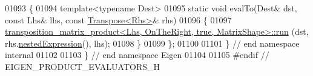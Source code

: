 \begin{DoxyCode}
01093 \{
01094   \textcolor{keyword}{template}<\textcolor{keyword}{typename} Dest>
01095   \textcolor{keyword}{static} \textcolor{keywordtype}{void} evalTo(Dest& dst, \textcolor{keyword}{const} Lhs& lhs, \textcolor{keyword}{const} \hyperlink{group___core___module_class_eigen_1_1_transpose}{Transpose<Rhs>}& rhs)
01096   \{
01097     \hyperlink{struct_eigen_1_1internal_1_1transposition__matrix__product}{transposition\_matrix\_product<Lhs, OnTheRight, true, MatrixShape>::run}
      (dst, rhs.\hyperlink{group___core___module_a72aefbf67f5e3caf62a99f73409b4a63}{nestedExpression}(), lhs);
01098   \}
01099 \};
01100 
01101 \} \textcolor{comment}{// end namespace internal}
01102 
01103 \} \textcolor{comment}{// end namespace Eigen}
01104 
01105 \textcolor{preprocessor}{#endif // EIGEN\_PRODUCT\_EVALUATORS\_H}
\end{DoxyCode}
